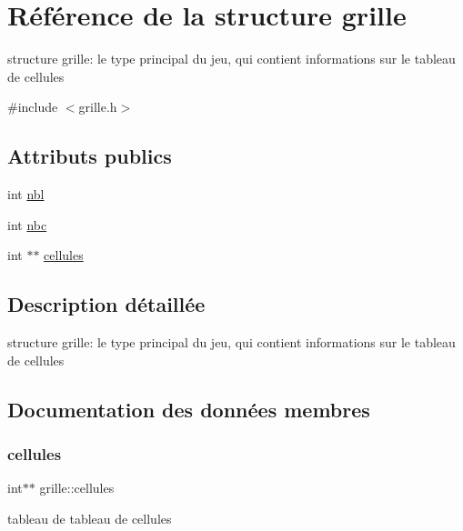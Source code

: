 \hypertarget{structgrille}{}\section{Référence de la structure grille}
\label{structgrille}


structure grille\+: le type principal du jeu, qui contient informations sur le tableau de cellules  




{\ttfamily \#include $<$grille.\+h$>$}

\subsection*{Attributs publics}
\begin{DoxyCompactItemize}
\item 
int \hyperlink{structgrille_a0b4da1e205825df205b0c004d105d62a}{nbl}
\item 
int \hyperlink{structgrille_a48d6706d41bee6fff9200d872b8b0cd0}{nbc}
\item 
int $\ast$$\ast$ \hyperlink{structgrille_a428cf0c0297ce04e0206ba0067ac3b42}{cellules}
\end{DoxyCompactItemize}


\subsection{Description détaillée}
structure grille\+: le type principal du jeu, qui contient informations sur le tableau de cellules 

\subsection{Documentation des données membres}
\mbox{\label{structgrille_a428cf0c0297ce04e0206ba0067ac3b42}} 
\subsubsection{\texorpdfstring{cellules}{cellules}}
{\footnotesize\ttfamily int$\ast$$\ast$ grille\+::cellules}

tableau de tableau de cellules \mbox{\label{structgrille_a48d6706d41bee6fff9200d872b8b0cd0}} 
